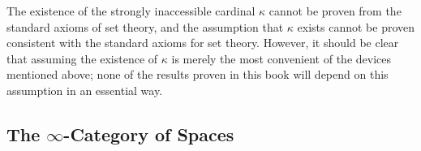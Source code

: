 \begin{1.2.15 Set-Theoretic Technicalities}
\begin{remark}
The existence of the strongly inaccessible cardinal $\kappa$ cannot be proven from the standard axioms of set theory, and the assumption that $\kappa$ exists cannot be proven consistent with the standard axioms for set theory. However, it should be clear that assuming the existence of $\kappa$ is merely the most convenient of the devices mentioned above; none of the results proven in this book will depend on this assumption in an essential way.
\end{remark}
\end{1.2.15 Set-Theoretic Technicalities}
\subsection{The $\infty$-Category of Spaces}\label{introducingspaces}
